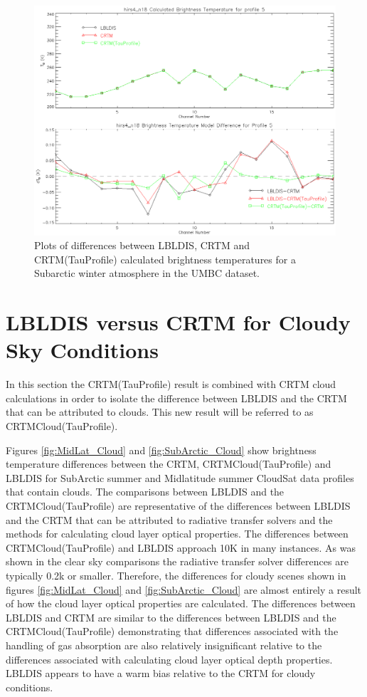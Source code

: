 \begin{figure}[htp]
  \centering{}
  \includegraphics[scale=0.8]{./graphics/SubArc_Winter_05.eps}
  \caption{Plots of differences between LBLDIS, CRTM and CRTM(TauProfile) calculated brightness temperatures for
   a Subarctic winter atmosphere in the UMBC dataset.}
  \label{fig:Subarctic_Winter_Dep}
\end{figure}

\newpage{}

\section{LBLDIS versus CRTM for Cloudy Sky Conditions}

In this section the CRTM(TauProfile) result is combined with CRTM cloud calculations in order to isolate the difference between LBLDIS and 
the CRTM that can be attributed to clouds. This new result will be referred to as CRTM\textunderscore{}Cloud(TauProfile).

Figures \ref{fig:MidLat_Cloud} and \ref{fig:SubArctic_Cloud} show brightness temperature differences between the CRTM, CRTM\textunderscore{}Cloud(TauProfile) and LBLDIS for
SubArctic summer and Midlatitude summer CloudSat data profiles that contain clouds. The comparisons between LBLDIS and the CRTM\textunderscore{}Cloud(TauProfile) are representative of the differences between LBLDIS and the CRTM that can be attributed to radiative transfer solvers and the methods for calculating cloud layer optical properties. The differences between CRTM\textunderscore{}Cloud(TauProfile) and LBLDIS approach 10K in many instances. As was shown in the clear sky comparisons the radiative transfer solver differences are typically 0.2k or smaller. Therefore, the differences for cloudy scenes shown in figures \ref{fig:MidLat_Cloud} and \ref{fig:SubArctic_Cloud} are almost entirely a result of how the cloud layer optical properties are calculated. The differences between LBLDIS and CRTM are similar to the differences between LBLDIS and the CRTM\textunderscore{}Cloud(TauProfile) demonstrating that differences associated with the handling of gas absorption are also relatively insignificant relative to the differences associated with calculating cloud layer optical depth properties. LBLDIS appears to have a warm bias relative to the CRTM for cloudy conditions.


